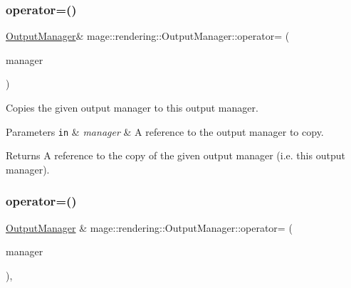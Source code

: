 \subsubsection{\texorpdfstring{operator=()}{operator=()}\hspace{0.1cm}{\footnotesize\ttfamily [1/2]}}
{\footnotesize\ttfamily \mbox{\hyperlink{classmage_1_1rendering_1_1_output_manager}{Output\+Manager}}\& mage\+::rendering\+::\+Output\+Manager\+::operator= (\begin{DoxyParamCaption}\item[{const \mbox{\hyperlink{classmage_1_1rendering_1_1_output_manager}{Output\+Manager}} \&}]{manager }\end{DoxyParamCaption})\hspace{0.3cm}{\ttfamily [delete]}}

Copies the given output manager to this output manager.


\begin{DoxyParams}[1]{Parameters}
\mbox{\tt in}  & {\em manager} & A reference to the output manager to copy. \\
\hline
\end{DoxyParams}
\begin{DoxyReturn}{Returns}
A reference to the copy of the given output manager (i.\+e. this output manager). 
\end{DoxyReturn}
\mbox{\label{classmage_1_1rendering_1_1_output_manager_a97d2c2be4389a615eb084dd53af531aa}} 
\subsubsection{\texorpdfstring{operator=()}{operator=()}\hspace{0.1cm}{\footnotesize\ttfamily [2/2]}}
{\footnotesize\ttfamily \mbox{\hyperlink{classmage_1_1rendering_1_1_output_manager}{Output\+Manager}} \& mage\+::rendering\+::\+Output\+Manager\+::operator= (\begin{DoxyParamCaption}\item[{\mbox{\hyperlink{classmage_1_1rendering_1_1_output_manager}{Output\+Manager}} \&\&}]{manager }\end{DoxyParamCaption})\hspace{0.3cm}{\ttfamily [default]}, {\ttfamily [noexcept]}}

